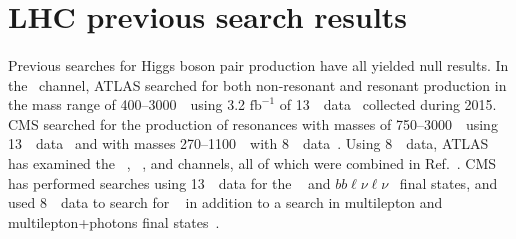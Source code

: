 
\section{LHC previous search results}

\paragraph{}
Previous searches for Higgs boson pair production have all yielded null results. In the \bbbb~channel, ATLAS searched for both non-resonant and resonant production in the mass range of 400--3000~\GeV\ using 3.2 $\mathrm{fb}^{-1}$ of 13~\TeV\ data~\cite{EXOT-2015-11} collected during 2015. CMS searched for the production of resonances with masses of 750--3000~\GeV\ using 13~\TeV\ data~\cite{CMS-B2G-16-026} and with masses 270--1100~\GeV\ with 8~\TeV\ data~\cite{CMS-HIG-14-013}. Using 8~\TeV\ data, ATLAS has examined the \bbbb~\cite{Aad:2015uka}, \bbgg~\cite{HIGG-2013-29}, \bbtautau and \WWgg channels, all of which were combined in Ref.~\cite{HIGG-2013-33}. CMS has performed searches using 13~\TeV\ data for the \bbtautau~\cite{CMS-HIG-17-002} and $bb\ell\nu\ell\nu$~\cite{CMSHIG17006} final states, and used 8~\TeV\ data to search for \bbgg~\cite{Khachatryan:2016sey} in addition to a search in multilepton and multilepton+photons final states~\cite{Khachatryan:2014jya}.

